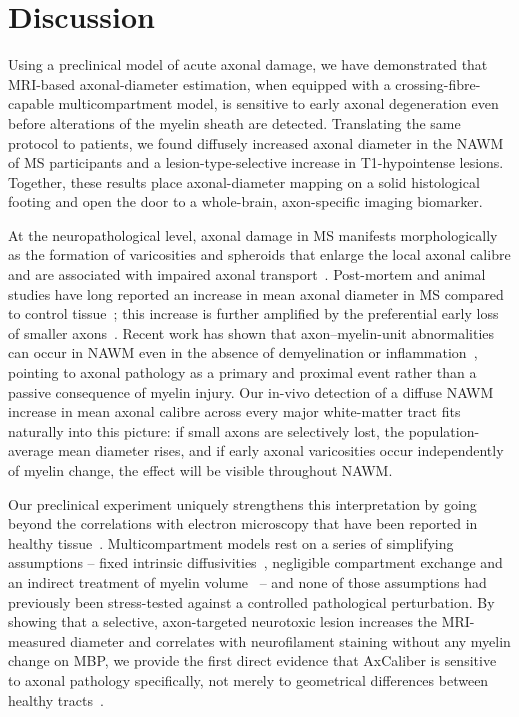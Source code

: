 \documentclass[11pt]{article}
\begin{document}
\section{Discussion}

Using a preclinical model of acute axonal damage, we have demonstrated that MRI-based axonal-diameter estimation, when equipped with a crossing-fibre-capable multicompartment model, is sensitive to early axonal degeneration even before alterations of the myelin sheath are detected. Translating the same protocol to patients, we found diffusely increased axonal diameter in the NAWM of MS participants and a lesion-type-selective increase in T1-hypointense lesions. Together, these results place axonal-diameter mapping on a solid histological footing and open the door to a whole-brain, axon-specific imaging biomarker.

At the neuropathological level, axonal damage in MS manifests morphologically as the formation of varicosities and spheroids that enlarge the local axonal calibre and are associated with impaired axonal transport~\cite{criste2014axonal,tallantyre2010demyelinated}. Post-mortem and animal studies have long reported an increase in mean axonal diameter in MS compared to control tissue~\cite{bergers2002axonal,nikic2011reversible}; this increase is further amplified by the preferential early loss of smaller axons~\cite{tallantyre2010demyelinated}. Recent work has shown that axon--myelin-unit abnormalities can occur in NAWM even in the absence of demyelination or inflammation~\cite{luchicchi2021axonal,teo2021nilered}, pointing to axonal pathology as a primary and proximal event rather than a passive consequence of myelin injury. Our in-vivo detection of a diffuse NAWM increase in mean axonal calibre across every major white-matter tract fits naturally into this picture: if small axons are selectively lost, the population-average mean diameter rises, and if early axonal varicosities occur independently of myelin change, the effect will be visible throughout NAWM.

Our preclinical experiment uniquely strengthens this interpretation by going beyond the correlations with electron microscopy that have been reported in healthy tissue~\cite{barazany2009invivo,horowitz2015axon}. Multicompartment models rest on a series of simplifying assumptions -- fixed intrinsic diffusivities~\cite{alexander2010orientationally}, negligible compartment exchange and an indirect treatment of myelin volume~\cite{assaf2008axcaliber} -- and none of those assumptions had previously been stress-tested against a controlled pathological perturbation. By showing that a selective, axon-targeted neurotoxic lesion increases the MRI-measured diameter and correlates with neurofilament staining without any myelin change on MBP, we provide the first direct evidence that AxCaliber is sensitive to axonal pathology specifically, not merely to geometrical differences between healthy tracts~\cite{conforti2014wallerian,adalbert2012intra}.
\end{document}
